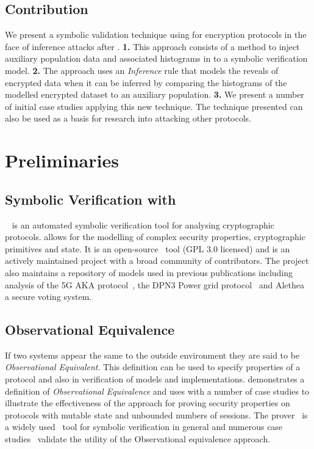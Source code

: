\documentclass[runningheads]{llncs}
\begin{document}


\subsection{Contribution}
We present a symbolic validation technique using \tamarin{} for encryption protocols in the face of inference attacks after \cite{InfrenceAttacks}. \textbf{1.} This approach consists of a method to inject auxiliary population data and associated histograms in to a symbolic verification model. \textbf{2.} The approach uses an \textit{Inference} rule that models the reveals of encrypted data when it can be inferred by comparing the histograms of the modelled encrypted dataset to an auxiliary population. \textbf{3.} We present a number of initial case studies applying this new technique.
The technique presented can also be used as a basis for research into attacking other protocols.

\section{Preliminaries}

\subsection{Symbolic Verification with \tamarin{}}
\tamarin{}~\cite{Meier2013} is an automated symbolic verification tool for analysing cryptographic protocols. \tamarin{} allows for the modelling of complex security properties, cryptographic primitives and state. It is an open-source~\cite{TamarinGithub} tool (GPL 3.0 licensed) and is an actively maintained project with a broad community of contributors. The project also maintains a repository of models used in previous publications including analysis of the 5G AKA protocol~\cite{5GAKA}, the DPN3 Power grid protocol~\cite{DNP3} and Alethea~\cite{Alethea} a secure voting system.

\subsection{Observational Equivalence}
If two systems appear the same to the outside environment they are said to be \textit{Observational Equivalent}.
This definition can be used to specify properties of a protocol and also in verification of models and implementations. 
\cite{ObsEqvCCS15} demonstrates a definition of \textit{Observational Equivalence} and uses \tamarin{} with a number of case studies to illustrate the effectiveness of the approach for proving security properties on protocols with mutable state and unbounded numbers of sessions. The \tamarin{} prover~\cite{Schmidt2012AutomatedProperties} is a widely used~\cite{ARPKICCS14,Donenfeld} tool for symbolic verification in general and numerous case studies~\cite{Norwegian,5GAKA} validate the utility of the Observational equivalence approach.
\end{document}
